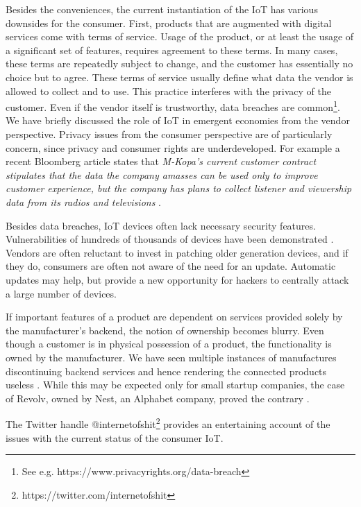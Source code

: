 Besides the conveniences, the current instantiation of the IoT has various downsides for the consumer. First, products that are augmented with digital services come with terms of service. Usage of the product, or at least the usage of a significant set of features, requires agreement to these terms. In many cases, these terms are repeatedly subject to change, and the customer has essentially no choice but to agree. These terms of service usually define what data the vendor is allowed to collect and to use.
This practice interferes with the privacy of the customer. Even if the vendor itself is trustworthy, data breaches are common\footnote{See e.g. https://www.privacyrights.org/data-breach}. We have briefly discussed the role of IoT in emergent economies from the vendor perspective. Privacy issues from the consumer perspective are of particularly concern, since privacy and consumer rights are underdeveloped. For example  a recent Bloomberg article states that \emph{M-Kopa’s current customer contract stipulates that the data the company amasses can be used only to improve customer experience, but the company has plans to collect listener and viewership data from its radios and televisions} \parencite{Faris2015}. 

Besides data breaches, IoT devices often lack necessary security features. Vulnerabilities of hundreds of thousands of devices have been demonstrated \parencite{7546527,Bodenheim2014114,184449,garcia2016lock}. Vendors are often reluctant to invest in patching older generation devices, and if they do, consumers are often not aware of the need for an update. Automatic updates may help, but provide a new opportunity for hackers to centrally attack a large number of devices.

If important features of a product are dependent on services provided solely by the manufacturer's backend, the notion of ownership becomes blurry. Even though a customer is in physical possession of a product, the functionality is owned by the manufacturer. We have seen multiple instances of manufactures discontinuing backend services and hence rendering the connected products useless \parencite{Cox2016}. While this may be expected only for small startup companies, the case of Revolv, owned by Nest, an Alphabet company, proved the contrary \parencite{Gilbert2016}.

The Twitter handle @internetofshit\footnote{https://twitter.com/internetofshit} provides an entertaining account of the issues with the current status of the consumer IoT.

